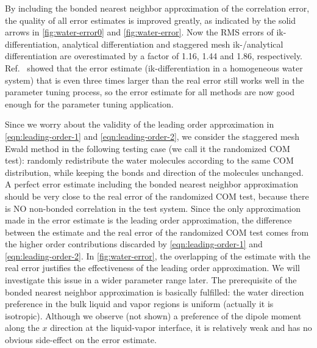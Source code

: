 \documentclass[journal=jacsat,manuscript=article]{achemso}
\newcommand{\recheck}[1]{{\color{black} #1}}
\begin{document}
By including the \recheck{bonded} nearest neighbor approximation of the 
correlation error, the quality of all error estimates is improved greatly,
as indicated by the solid arrows in \ref{fig:water-error0} and \ref{fig:water-error}.
Now the RMS errors of ik-differentiation, analytical differentiation
and staggered mesh ik-/analytical differentiation
are overestimated by a factor of 1.16, 1.44 and 1.86,
respectively.
Ref.~\cite{wang2010optimizing} showed that the error estimate
(ik-differentiation in a homogeneous water system) that
is even three times larger than the real error
still works well in the parameter tuning process, 
so the error estimate for  all methods are now good enough
for the parameter tuning application.
\recheck{
  Since we
  worry about the validity of the leading order
  approximation in
  \ref{eqn:leading-order-1} and \ref{eqn:leading-order-2},
  we consider 
  the staggered mesh Ewald method in the following testing case
  (we call it the randomized COM test):
  randomly redistribute the water molecules according to the same
  COM distribution, while keeping
  the bonds and direction of the molecules unchanged.
  A perfect error estimate including the bonded nearest neighbor
  approximation
  should be very close to the real error of the randomized COM test,
  because there is NO non-bonded correlation in the test system.
  Since the only approximation made in the error estimate
  is the leading order approximation, the difference between
  the estimate and the real error of the randomized COM test
  comes from the higher order contributions discarded by
  \ref{eqn:leading-order-1} and \ref{eqn:leading-order-2}.
  In \ref{fig:water-error}, the overlapping of the estimate
  with the real error justifies the effectiveness of the
  leading order approximation. We will investigate this issue
  in a wider parameter range later.
  The prerequisite of the bonded nearest neighbor approximation
  is basically fulfilled:
  the water direction preference in the bulk liquid and
  vapor regions is uniform (actually it is isotropic).
  Although
  we observe (not shown)
  a preference of the dipole moment along the $x$ direction
  at the liquid-vapor interface, it is relatively weak and has  no
  obvious side-effect on the error estimate.

}
\end{document}
